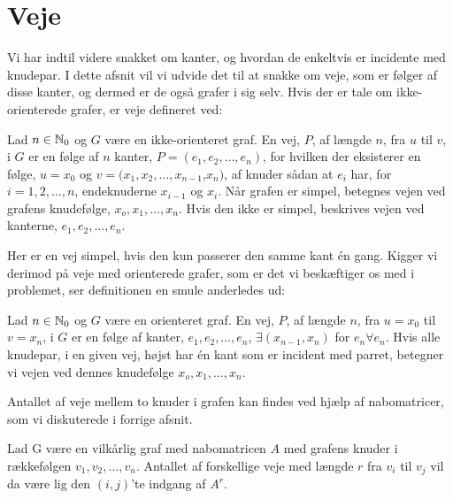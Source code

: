 \section{Veje}
Vi har indtil videre snakket om kanter, og hvordan de enkeltvis er incidente med knudepar. I dette afsnit vil vi udvide det til at snakke om veje, som er følger af disse kanter, og dermed er de også grafer i sig selv. Hvis der er tale om ikke-orienterede grafer, er veje defineret ved:
\begin{defn}
Lad $n \in \mathbb{N} _0$  og $G$ være en ikke-orienteret graf. En vej, $P$, af længde $n$, fra $u$ til $v$, i $G$ er en følge af $n$ kanter,  $ P= (e_{1},e_{2},\dotsc,e_{n})$, for hvilken der eksisterer en følge, $u=x_{0}$ og $v=(x_{1},x_{2},\dotsc,x_{n-1}$,$x_{n})$, af knuder sådan at $e_{i}$ har, for $i=1,2,\dotsc,n$, endeknuderne $x_{i-1}$ og $x_{i}$. Når grafen er simpel, betegnes vejen ved grafens knudefølge, $x_{o},x_{1},\dotsc,x_{n}$. Hvis den ikke er simpel, beskrives vejen ved kanterne, $e_{1},e_{2},\dotsc,e_{n}$. 
\end{defn}
Her er en vej simpel, hvis den kun passerer den samme kant én gang. Kigger vi derimod på veje med orienterede grafer, som er det vi beskæftiger os med i problemet, ser definitionen en smule anderledes ud:
\begin{defn}
Lad $n \in \mathbb{N} _0$ og $G$ være en orienteret graf. En vej, $P$, af længde $n$, fra $u = x_0$ til $v = x_n$, i $G$ er en følge af kanter, $e_{1},e_{2},\dotsc,e_{n}$, $ \exists (x_{n-1},x_{n}) $ for $e_{n} \forall e_n$. Hvis alle knudepar, i en given vej, højst har én kant som er incident med parret, betegner vi vejen ved dennes knudefølge $x_{o},x_{1},\dotsc,x_{n}$.
\end{defn}



Antallet af veje mellem to knuder i grafen kan findes ved hjælp af nabomatricer, som vi diskuterede i forrige afsnit.
\begin{thm}
Lad G være en vilkårlig graf med nabomatricen
\textbf{$A$} med grafens knuder i rækkefølgen $v_{1},v_{2},\dotsc,v_{n}$. Antallet af forskellige veje med længde $r$ fra $v_{i}$ til $v_{j}$ vil da være lig den $(i,j)$'te indgang af \textbf{$A^{r}$}.
\end{thm}

